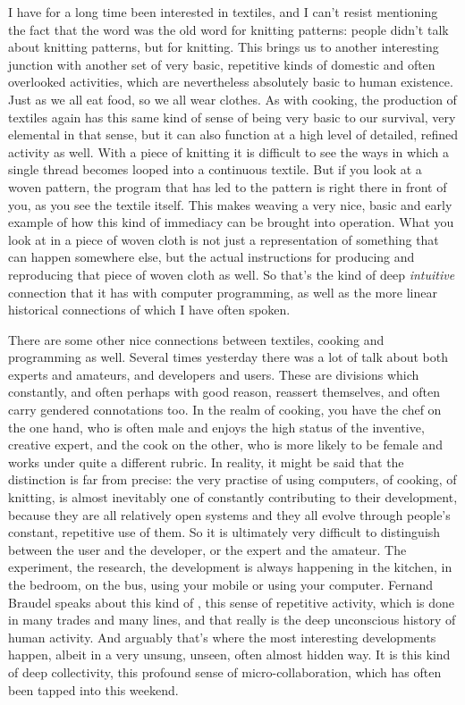 {I have for a long time been interested in textiles, and I can't resist
mentioning the fact that the word  was the old word for
knitting patterns: people didn't talk about knitting patterns, but
 for knitting. This brings us to another interesting junction
with another set of very basic, repetitive kinds of domestic and often
overlooked activities, which are nevertheless absolutely basic to human
existence. Just as we all eat food, so we all wear clothes. As with
cooking, the production of textiles again has this same kind of sense
of being very basic to our survival, very elemental in that sense, but
it can also function at a high level of detailed, refined activity as
well. With a piece of knitting it is difficult to see the ways in which
a single thread becomes looped into a continuous textile. But if you
look at a woven pattern, the program that has led to the pattern is
right there in front of you, as you see the textile itself. This makes
weaving a very nice, basic and early example of how this kind of
immediacy can be brought into operation. What you look at in a piece of
woven cloth is not just a representation of something that can happen
somewhere else, but the actual instructions for producing and
reproducing that piece of woven cloth as well. So that's the kind of
deep {\em intuitive} connection that it has with computer
programming, as well as the more linear historical connections of which
I have often spoken. 

There are some other nice connections between textiles, cooking and
programming as well. Several times yesterday there was a lot of talk
about both experts and amateurs, and developers and users. These are
divisions which constantly, and often perhaps with good reason,
reassert themselves, and often carry gendered connotations too. In the
realm of cooking, you have the chef on the one hand, who is often male
and enjoys the high status of the inventive, creative expert, and the
cook on the other, who is more likely to be female and works under
quite a different rubric. In reality, it might be said that the
distinction is far from precise: the very practise of using computers,
of cooking, of knitting, is almost inevitably one of constantly
contributing to their development, because they are all relatively open
systems and they all evolve through people's constant, repetitive use
of them. So it is ultimately very difficult to distinguish between the
user and the developer, or the expert and the amateur. The experiment,
the research, the development is always happening in the kitchen, in
the bedroom, on the bus, using your mobile or using your computer.
Fernand Braudel speaks about this kind of , this
sense of repetitive activity, which is done in many trades and many
lines, and that really is the deep unconscious history of human
activity. And arguably that's where the most interesting developments
happen, albeit in a very unsung, unseen, often almost hidden way. It is
this kind of deep collectivity, this profound sense of
micro{}-collaboration, which has often been tapped into this weekend. 

}
